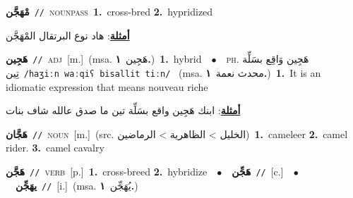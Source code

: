 \documentclass[10pt,a4paper,twoside]{article} %
\begin{document}
\begin{multicols}{2}
{\setlength\topsep{0pt}\textbf{\foreignlanguage{arabic}{مْهَجَّن}}\ {\color{gray}\texttt{//}\color{black}}\ \textsc{noun\textunderscore pass}\ \textbf{1.}~cross-bred  \textbf{2.}~hypridized\  \begin{flushright}\color{gray}\foreignlanguage{arabic}{\textbf{\underline{\foreignlanguage{arabic}{أمثلة}}}: هاد نوع البرتقال المْهَجَّن}\end{flushright}\color{black}} \vspace{2mm}

{\setlength\topsep{0pt}\textbf{\foreignlanguage{arabic}{هَجِين}}\ {\color{gray}\texttt{//}\color{black}}\ \textsc{adj}\ [m.]\ \color{gray}(msa. \foreignlanguage{arabic}{هَجِين}~\foreignlanguage{arabic}{\textbf{١.}})\color{black}\ \textbf{1.}~hybrid\ \ $\bullet$\ \ \textsc{ph.} \color{gray} \foreignlanguage{arabic}{هَجِين وَاقِع بسَلِّة تِين}\color{black}\ {\color{gray}\texttt{/{\sffamily haʒiːn waːqiʕ bisallit tiːn}/}\color{black}}\ \color{gray} (msa. \foreignlanguage{arabic}{محدث نعمة}~\foreignlanguage{arabic}{\textbf{١.}})\color{black}\ \textbf{1.}~It is an idiomatic expression that means nouveau riche\  \begin{flushright}\color{gray}\foreignlanguage{arabic}{\textbf{\underline{\foreignlanguage{arabic}{أمثلة}}}: ابنك هَجِين واقع بسَلِّة تين ما صدق عالله شاف بنات}\end{flushright}\color{black}} \vspace{2mm}

{\setlength\topsep{0pt}\textbf{\foreignlanguage{arabic}{هَجَّان}}\ {\color{gray}\texttt{//}\color{black}}\ \textsc{noun}\ [m.]\ (src. \color{gray}\foreignlanguage{arabic}{الخليل > الظاهرية > الرماضين}\color{black})\ \textbf{1.}~cameleer  \textbf{2.}~camel rider.  \textbf{3.}~camel cavalry\ } \vspace{2mm}

{\setlength\topsep{0pt}\textbf{\foreignlanguage{arabic}{هَجَّن}}\ {\color{gray}\texttt{//}\color{black}}\ \textsc{verb}\ [p.]\ \textbf{1.}~cross-breed  \textbf{2.}~hybridize\ \ $\bullet$\ \ \setlength\topsep{0pt}\textbf{\foreignlanguage{arabic}{هَجِّن}}\ {\color{gray}\texttt{//}\color{black}}\ [c.]\ \ $\bullet$\ \ \setlength\topsep{0pt}\textbf{\foreignlanguage{arabic}{يهَجِّن}}\ {\color{gray}\texttt{//}\color{black}}\ [i.]\ \color{gray}(msa. \foreignlanguage{arabic}{يُهَجِّن}~\foreignlanguage{arabic}{\textbf{١.}})\color{black}\ } \vspace{2mm}


\end{multicols}
\end{document}
